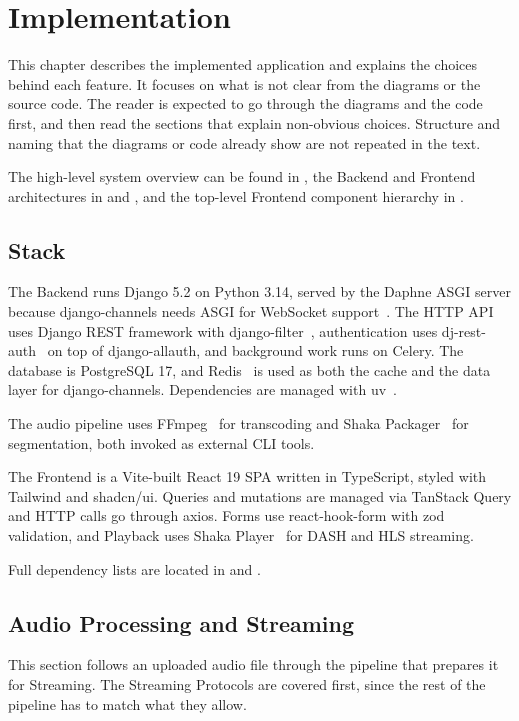 \chapter{Implementation}\label{ch:implementation}

This chapter describes the implemented application and explains the choices
behind each feature. It focuses on what is not clear from the diagrams
or the source code. The reader is expected to go through the diagrams
and the code first, and then read the sections that explain
non-obvious choices. Structure and naming that the diagrams or code
already show are not repeated in the text.

The high-level system
overview can be found in , the Backend
and Frontend architectures in 
and , and the top-level
Frontend component hierarchy in
.


\section{Stack}\label{sec:stack}
The Backend runs Django 5.2 on Python 3.14, served by the Daphne
ASGI server because django-channels needs ASGI for WebSocket
support~\parencite{daphne}. The HTTP API uses Django REST framework
with django-filter~\parencite{django_filter}, authentication uses
dj-rest-auth~\parencite{dj_rest_auth} on top of django-allauth, and
background work runs on Celery. The database is PostgreSQL 17, and
Redis~\parencite{redis} is used as both the cache and the data layer for
django-channels. Dependencies are managed with uv~\parencite{uv}.

The audio pipeline uses FFmpeg~\parencite{ffmpeg} for transcoding and Shaka
Packager~\parencite{shaka_packager} for segmentation, both invoked
as external CLI tools.

The Frontend is a Vite-built React 19 SPA written in TypeScript,
styled with Tailwind and shadcn/ui. Queries and mutations are managed via
TanStack Query and HTTP calls go through axios. Forms use
react-hook-form with zod validation, and Playback uses Shaka
Player~\parencite{shaka_player} for DASH and HLS streaming.

Full dependency lists are located in
 and
.


\section{Audio Processing and Streaming}
This section follows an uploaded audio file through the pipeline
that prepares it for Streaming. The Streaming Protocols are covered
first, since the rest of the pipeline has to match what they allow.

